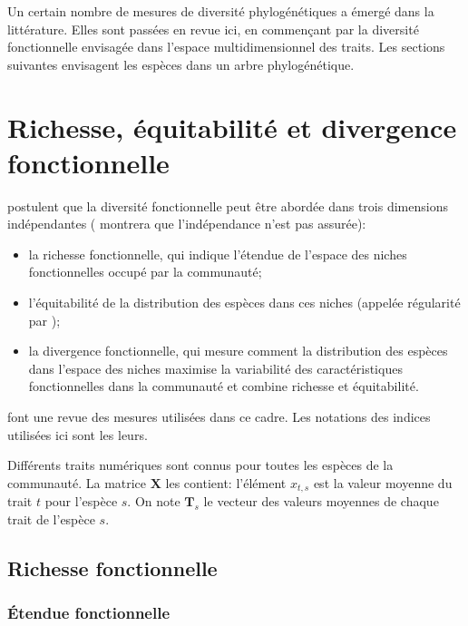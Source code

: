 \documentclass[
  11pt,
  french,
  a4paper,
  extrafontsizes,onecolumn,openright
  ]{memoir}
\providecommand{\tightlist}{%
  \setlength{\itemsep}{0pt}\setlength{\parskip}{0pt}}
\begin{document}
Un certain nombre de mesures de diversité phylogénétiques a émergé dans la littérature.
Elles sont passées en revue ici, en commençant par la diversité fonctionnelle envisagée dans l'espace multidimensionnel des traits.
Les sections suivantes envisagent les espèces dans un arbre phylogénétique.

\section{Richesse, équitabilité et divergence fonctionnelle}\label{richesse-uxe9quitabilituxe9-et-divergence-fonctionnelle}

\textcite{Mason2005} postulent que la diversité fonctionnelle peut être abordée dans trois dimensions indépendantes (\textcite{Jost2010} montrera que l'indépendance n'est pas assurée):

\begin{itemize}
\tightlist
\item
  la richesse fonctionnelle, qui indique l'étendue de l'espace des niches fonctionnelles occupé par la communauté;
\item
  l'équitabilité de la distribution des espèces dans ces niches (appelée régularité par \textcite{Pavoine2011});
\item
  la divergence fonctionnelle, qui mesure comment la distribution des espèces dans l'espace des niches maximise la variabilité des caractéristiques fonctionnelles dans la communauté et combine richesse et équitabilité.
\end{itemize}

\textcite{Schleuter2010} font une revue des mesures utilisées dans ce cadre.
Les notations des indices utilisées ici sont les leurs.

Différents traits numériques sont connus pour toutes les espèces de la communauté.
La matrice \(\mathbf{X}\) les contient: l'élément \(x_{t,s}\) est la valeur moyenne du trait \(t\) pour l'espèce \(s\).
On note \(\mathbf{T}_s\) le vecteur des valeurs moyennes de chaque trait de l'espèce \(s\).

\subsection{Richesse fonctionnelle}\label{richesse-fonctionnelle}

\subsubsection{Étendue fonctionnelle}\label{uxe9tendue-fonctionnelle}
\end{document}

